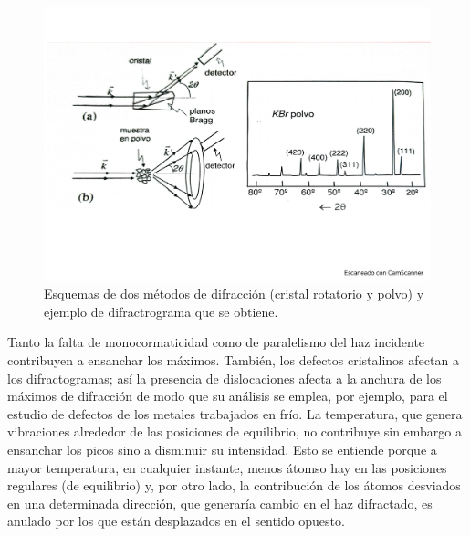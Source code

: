     
\begin{figure}[h!] \centering
    \includegraphics[scale=0.35]{Cuerpo/Ch_02/Fotos_libro 8.pdf}
    \caption{Esquemas de dos métodos de difracción (cristal rotatorio y polvo) y ejemplo de difractrograma que se obtiene.}
    \label{Fig:02-08}
\end{figure}

Tanto la falta de monocormaticidad como de paralelismo del haz incidente contribuyen a ensanchar los máximos. También, los defectos cristalinos afectan a los difractogramas; así la presencia de dislocaciones afecta a la anchura de los máximos de difracción de modo que su análisis se emplea, por ejemplo, para el estudio de defectos de los metales trabajados en frío. La temperatura, que genera vibraciones alrededor de las posiciones de equilibrio, no contribuye sin embargo a ensanchar los picos sino a disminuir su intensidad. Esto se entiende porque a mayor temperatura, en cualquier instante, menos átomso hay en las posiciones regulares (de equilibrio) y, por otro lado, la contribución de los átomos desviados en una determinada dirección, que generaría cambio en el haz difractado, es anulado por los que están desplazados en el sentido opuesto. 
    
